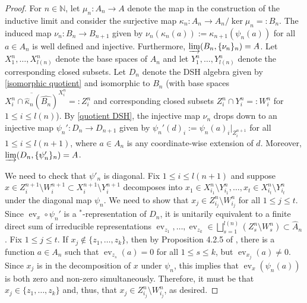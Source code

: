 \documentclass[12pt]{amsart}
\numberwithin{equation}{section}
\theoremstyle{definition}
\theoremstyle{remark}
\newcommand{\ev}{\operatorname{ev}}
\newcommand{\NN}{\mathbb{N}}
\begin{document}
\begin{proof}
	For $n\in\NN$, let $\mu_{n}\colon A_{n}\to A$ denote the map in the construction of the inductive limit and consider the surjective map $\kappa_{n}\colon A_{n}\to A_{n}/\ker\mu_{n}=:B_{n}$. The induced map $\nu_{n}\colon B_{n}\to B_{n+1}$ given by $\nu_{n}(\kappa_{n}(a)):=\kappa_{n+1}(\psi_{n}(a))$ for all $a\in A_{n}$ is well defined and injective. Furthermore, $\varinjlim(B_{n},\{\nu_{n}\}_{n})=A$. Let $X_{1}^{n},\ldots,X_{ l(n)}^{n}$ denote the base spaces of $A_{n}$ and let $Y_{1}^{n},\ldots,Y_{ l(n)}^{n}$ denote the corresponding closed subsets. Let $D_{n}$ denote the DSH algebra given by \autoref{isomorphic quotient} and isomorphic to $B_{n}$ (with base spaces $\overline{X_{i}^{n}\cap\hat{\kappa}_{n}(\hat{B_{n}})}^{X_{i}^{n}}=:Z_{i}^{n}$ and corresponding closed subsets $Z_{i}^{n}\cap Y_{i}^{n}=:W_{i}^{n}$ for $1\leq i\leq  l(n)$). By \autoref{quotient DSH}, the injective map $\nu_{n}$ drops down to an injective map $\psi_{n}'\colon D_{n}\to D_{n+1}$ given by $\psi_{n}'(d)_{i}:=\psi_{n}(a)_{i}|_{Z_{i}^{n+1}}$ for all $1\leq i\leq  l(n+1)$, where $a\in A_{n}$ is any coordinate-wise extension of $d$. Moreover, $\varinjlim(D_{n},\{\psi'_{n}\}_{n})=A$.
	
	We need to check that $\psi'_{n}$ is diagonal. Fix $1\leq i\leq  l(n+1)$ and suppose $x\in Z_{i}^{n+1}\setminus W_{i}^{n+1}\subset X^{n+1}_{i}\setminus Y_{i}^{n+1}$ decomposes into $x_{1}\in X_{i_{1}}^{n}\setminus Y_{i_{1}}^{n},\ldots,x_{t}\in X_{i_{t}}^{n}\setminus Y_{i_{t}}^{n}$ under the diagonal map $\psi_{n}$. We need to show that $x_{j}\in Z_{i_{j}}^{n}\setminus W_{i_{j}}^{n}$ for all $1\leq j\leq t$. Since $\ev_{x}\circ\psi_{n}'$ is a $^*$-representation of $D_{n}$, it is unitarily equivalent to a finite direct sum of irreducible representations $\ev_{z_{1}},\ldots,\ev_{z_{k}}\in\bigsqcup_{s=1}^{ l(n)}(Z_{s}^{n}\setminus W_{s}^{n})\subset \hat{A}_{n}$. Fix $1\leq j\leq t$. If $x_{j}\notin\{z_{1},\ldots,z_{k}\}$, then by Proposition 4.2.5 of \cite{dix}, there is a function $a\in A_{n}$ such that $\ev_{z_{s}}(a)=0$ for all $1\leq s\leq k$, but $\ev_{x_{j}}(a)\not=0$. Since $x_{j}$ is in the decomposition of $x$ under $\psi_{n}$, this implies that $\ev_{x}(\psi_{n}(a))$ is both zero and non-zero simultaneously. Therefore, it must be that $x_{j}\in \{z_{1},\ldots,z_{k}\}$ and, thus, that $x_{j}\in Z_{i_{j}}^{n}\setminus W_{i_{j}}^{n}$, as desired.
\end{proof}
\end{document}
